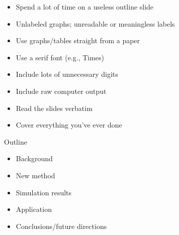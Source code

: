 \documentclass[12pt]{article}
\newcommand{\headsize}{\fontsize{35}{35} \selectfont}
\newcommand{\smallsize}{\fontsize{25}{30} \selectfont}
\begin{document}
\hfill \begin{minipage}{9.5in}

\begin{itemize}
\itemsep18pt
\item Spend a lot of time on a useless outline slide

\color{myblue}
\item Unlabeled graphs; unreadable or meaningless labels

\item Use graphs/tables straight from a paper

\item Use a serif font (e.g., Times)

\item Include lots of unnecessary digits

\item Include raw computer output

\item Read the slides verbatim

\item Cover everything you've ever done

\end{itemize}

\end{minipage}



\newpage

\headsize \color{myyellow}
\hfill \begin{minipage}{5.75in}
\centering
Outline
\end{minipage}

\vspace{30mm} \color{mywhite} \smallsize

\hfill \begin{minipage}{9.5in}

\begin{itemize}
\itemsep18pt
\item Background

\item New method

\item Simulation results

\item Application

\item Conclusions/future directions
\end{itemize}
\end{minipage}
\end{document}
